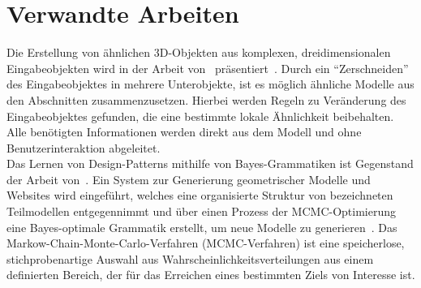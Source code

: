 \section{Verwandte Arbeiten}
Die Erstellung von ähnlichen 3D-Objekten aus komplexen, dreidimensionalen Eingabeobjekten wird in der Arbeit von~\citeauthor{bokeloh_2010}
präsentiert~\cite{bokeloh_2010}.
Durch ein "`Zerschneiden"' des Eingabeobjektes in mehrere Unterobjekte, ist es möglich ähnliche Modelle aus den
Abschnitten zusammenzusetzen.
Hierbei werden Regeln zu Veränderung des Eingabeobjektes gefunden, die eine bestimmte lokale Ähnlichkeit beibehalten.
Alle benötigten Informationen werden direkt aus dem Modell und ohne Benutzerinteraktion abgeleitet.\\
Das Lernen von Design-Patterns mithilfe von Bayes-Grammatiken ist Gegenstand der Arbeit von~\citeauthor{talton_2012}.
Ein System zur Generierung geometrischer Modelle und Websites wird eingeführt, welches eine organisierte
Struktur von bezeichneten Teilmodellen entgegennimmt und über einen Prozess der MCMC-Optimierung eine Bayes-optimale
Grammatik erstellt, um neue Modelle zu generieren~\cite{talton_2012}.
Das Markow-Chain-Monte-Carlo-Verfahren (MCMC-Verfahren) ist eine speicherlose, stichprobenartige Auswahl aus
Wahrscheinlichkeitsverteilungen aus einem definierten Bereich, der für das Erreichen eines bestimmten Ziels von
Interesse ist.

\newpage

